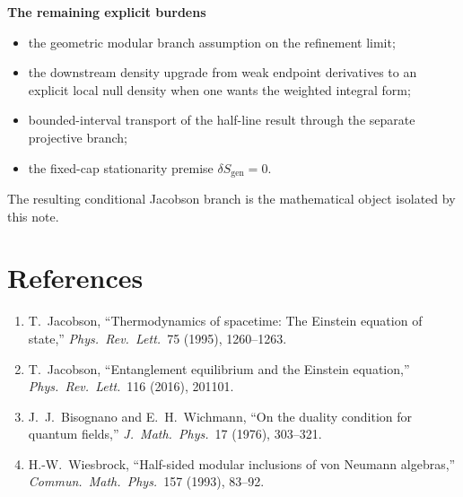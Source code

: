 \documentclass[10pt]{article}
\begin{document}
\textbf{The remaining explicit burdens}
\begin{itemize}[leftmargin=1.8em]
\item the geometric modular branch assumption on the refinement limit;
\item the downstream density upgrade from weak endpoint derivatives to an explicit local null density when one wants the weighted integral form;
\item bounded-interval transport of the half-line result through the separate projective branch;
\item the fixed-cap stationarity premise \(\delta S_{\mathrm{gen}}=0\).
\end{itemize}

The resulting conditional Jacobson branch is the mathematical object isolated by this note.

\section*{References}

\begingroup\small
\begin{enumerate}[leftmargin=1.8em,itemsep=0.15em]
\item T.~Jacobson, ``Thermodynamics of spacetime: The Einstein equation of state,'' \emph{Phys.\ Rev.\ Lett.}\ 75 (1995), 1260--1263.
\item T.~Jacobson, ``Entanglement equilibrium and the Einstein equation,'' \emph{Phys.\ Rev.\ Lett.}\ 116 (2016), 201101.
\item J.~J.~Bisognano and E.~H.~Wichmann, ``On the duality condition for quantum fields,'' \emph{J.\ Math.\ Phys.}\ 17 (1976), 303--321.
\item H.-W.~Wiesbrock, ``Half-sided modular inclusions of von Neumann algebras,'' \emph{Commun.\ Math.\ Phys.}\ 157 (1993), 83--92.
\end{enumerate}
\endgroup
\end{document}
